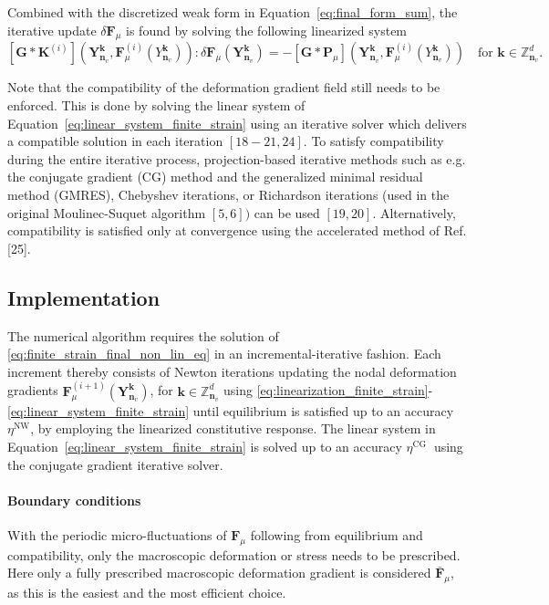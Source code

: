 Combined with the discretized weak form in Equation~\eqref{eq:final_form_sum}, the iterative update \(\delta {\bm{F}_\mu}\) is found by solving the following linearized system
\begin{equation} \label{eq:linear_system_finite_strain}
[\bm{G}* \bm K^{(i)}] \left(\bm Y_{\bm n_v}^{\bm  k}, \bm F_\mu^{(i)}\left(Y_{\bm n_v}^{\bm  k}\right)\right):\delta {\bm{F}_\mu}\left(\bm Y_{\bm n_v}^{\bm  k}\right)=-[\bm{G}* \bm{P}_\mu]\left(\bm Y_{\bm n_v}^{\bm  k}, \bm F_\mu^{(i)}\left(Y_{\bm n_v}^{\bm  k}\right)\right)\quad\text{for \(\bm k\in \mathbb Z^d_{\bm n_v}\)}.
\end{equation}

Note that the compatibility of the deformation gradient field still needs to be enforced.
This is done by solving the linear system of Equation~\eqref{eq:linear_system_finite_strain} using an iterative solver which delivers a compatible solution in each iteration \([18-21,24]\).
To satisfy compatibility during the entire iterative process, projection-based iterative methods such as e.g. the conjugate gradient (CG) method and the generalized minimal residual method (GMRES), Chebyshev iterations, or Richardson iterations (used in the original Moulinec-Suquet algorithm \([5,6])\) can be used \([19,20]\).
Alternatively, compatibility is satisfied only at convergence using the accelerated method of Ref. [25].

\subsection{Implementation}

The numerical algorithm requires the solution of \eqref{eq:finite_strain_final_non_lin_eq} in an incremental-iterative fashion.
Each increment thereby consists of Newton iterations updating the nodal deformation gradients \(\bm{F}_\mu^{(i+1)}(\bm Y^{\bm k}_{\bm n_v})\), for \(\bm k\in \mathbb Z^d_{\bm n_v}\) using \eqref{eq:linearization_finite_strain}-\eqref{eq:linear_system_finite_strain} until equilibrium is satisfied up to an accuracy \(\eta^{\mathrm{NW}}\), by employing the linearized constitutive response.
The linear system in Equation~\eqref{eq:linear_system_finite_strain} is solved up to an accuracy \(\eta^{\text {CG }}\) using the conjugate gradient iterative solver.
\paragraph{Boundary conditions}

With the periodic micro-fluctuations of \(\bm{F}_\mu\) following from equilibrium and compatibility, only the macroscopic deformation or stress needs to be prescribed.
Here only a fully prescribed macroscopic deformation gradient is considered \(\bar{\bm{F}}_\mu\), as this is the easiest and the most efficient choice.


